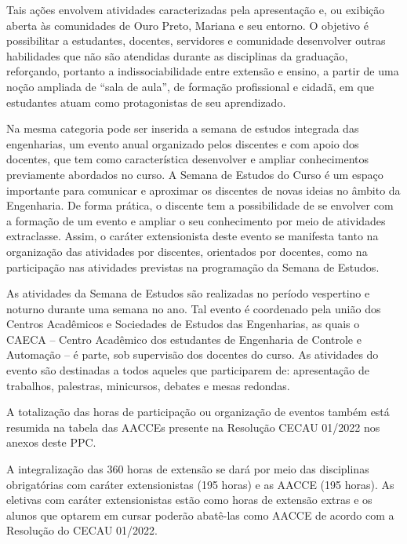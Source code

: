 \documentclass[
	12pt,				%
	openright,			%
	oneside,			%
	a4paper,			%
	english,			%
	brazil				%
	]{abntex2}
\begin{document}
Tais ações envolvem atividades caracterizadas pela apresentação e, ou exibição aberta às comunidades de Ouro Preto, Mariana e seu entorno. O objetivo é possibilitar a estudantes, docentes, servidores e comunidade desenvolver outras habilidades que não são atendidas durante as disciplinas da graduação, reforçando, portanto a indissociabilidade entre extensão e ensino, a partir de uma noção ampliada de ``sala de aula'', de formação profissional e cidadã, em que estudantes atuam como protagonistas de seu aprendizado.

Na mesma categoria pode ser inserida a semana de estudos integrada das engenharias, um evento anual organizado pelos discentes e com apoio dos docentes, que tem como característica desenvolver e ampliar conhecimentos previamente abordados no curso. A Semana de Estudos do Curso é um espaço importante para comunicar e aproximar os discentes de novas ideias no âmbito da Engenharia. De forma prática, o discente tem a possibilidade de se envolver com a formação de um evento e ampliar o seu conhecimento por meio de atividades extraclasse. Assim, o caráter extensionista deste evento se manifesta tanto na organização das atividades por discentes, orientados por docentes, como na participação nas atividades previstas na programação da Semana de Estudos.

As atividades da Semana de Estudos são realizadas no período vespertino e noturno durante uma semana no ano. Tal evento é coordenado pela união dos Centros Acadêmicos e Sociedades de Estudos das Engenharias, as quais o CAECA -- Centro Acadêmico dos estudantes de Engenharia de Controle e Automação -- é parte, sob supervisão dos docentes do curso. As atividades do evento são destinadas a todos aqueles que participarem de: apresentação de trabalhos, palestras, minicursos, debates e mesas redondas.

A totalização das horas de participação ou organização de eventos também está resumida na tabela das AACCEs presente na Resolução CECAU 01/2022 nos anexos deste PPC.

A integralização das 360 horas de extensão se dará por meio das disciplinas obrigatórias com caráter extensionistas (195 horas) e as AACCE (195 horas). As eletivas com caráter extensionistas estão como horas de extensão extras e os alunos que optarem em cursar poderão abatê-las como AACCE de acordo com a Resolução do CECAU 01/2022.
\end{document}
